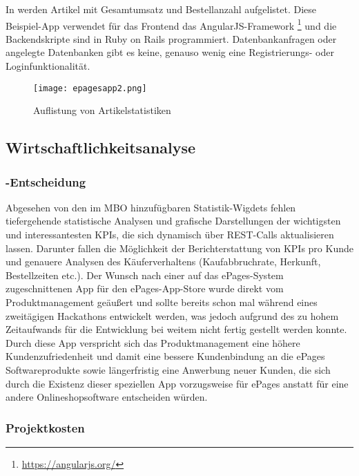 \newpage

In  werden Artikel mit Gesamtumsatz und Bestellanzahl aufgelistet. Diese Beispiel-App verwendet für das Frontend das AngularJS-Framework \footnote{\url{https://angularjs.org/}} und die Backendskripte sind in Ruby on Rails programmiert. Datenbankanfragen oder angelegte Datenbanken gibt es keine, genauso wenig eine Registrierungs- oder Loginfunktionalität.

\begin{figure}[htb]
\begin{center}
\texttt{[image: epagesapp2.png]}
\caption{Auflistung von Artikelstatistiken}
\label{fig:product}
\end{center}
\end{figure}
 
\subsection{Wirtschaftlichkeitsanalyse}
\label{sec:Wirtschaftlichkeitsanalyse}

\subsubsection{-Entscheidung}
\label{sec:MakeOrBuyEntscheidung}

Abgesehen von den im \acs{MBO} hinzufügbaren Statistik-Wigdets
fehlen tiefergehende statistische Analysen und grafische Darstellungen der wichtigsten und interessantesten KPIs, die sich dynamisch über REST-Calls aktualisieren lassen. Darunter fallen die Möglichkeit der Berichterstattung von KPIs pro Kunde und genauere Analysen des Käuferverhaltens (Kaufabbruchrate, Herkunft, Bestellzeiten etc.). Der Wunsch nach einer auf das ePages-System zugeschnittenen App für den ePages-App-Store wurde direkt vom Produktmanagement geäußert und sollte bereits schon mal während eines zweitägigen Hackathons entwickelt werden, was jedoch aufgrund des zu hohem Zeitaufwands für die Entwicklung bei weitem nicht fertig gestellt werden konnte. Durch diese App verspricht sich das Produktmanagement eine höhere Kundenzufriedenheit und damit eine bessere Kundenbindung an die ePages Softwareprodukte sowie längerfristig eine Anwerbung neuer Kunden, die sich durch die Existenz dieser speziellen App vorzugsweise für ePages anstatt für eine andere Onlineshopsoftware entscheiden würden.
\subsubsection{Projektkosten}
\label{sec:Projektkosten}

